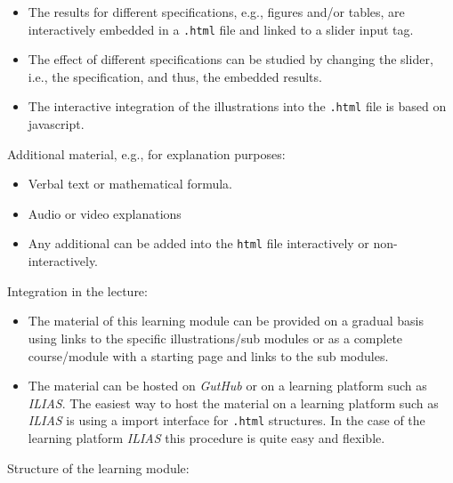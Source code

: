 \documentclass{article}
\begin{document}
\begin{itemize}
	\item The results for different specifications, e.g., figures and/or tables, are interactively embedded in a \texttt{.html} file and linked to a slider input tag.
	\item The effect of different specifications can be studied by changing the slider, i.e., the specification, and thus, the embedded results.
	\item The interactive integration of the illustrations into the \texttt{.html} file is based on javascript.
\end{itemize}

Additional material, e.g., for explanation purposes:

\begin{itemize}
	\item Verbal text or mathematical formula.
	\item Audio or video explanations
	\item Any additional can be added into the \texttt{html} file interactively or non-interactively.
\end{itemize}

Integration in the lecture:

\begin{itemize}
	\item The material of this learning module can be provided on a gradual basis using links to the specific illustrations/sub modules or as a complete course/module with a starting page and links to the sub modules.
	\item The material can be hosted on \emph{GutHub} or on a learning platform such as \emph{ILIAS}. The easiest way to host the material on a learning platform such as \emph{ILIAS} is using a import interface for \texttt{.html} structures. In the case of the learning platform \emph{ILIAS} this procedure is quite easy and flexible.	
\end{itemize}

Structure of the learning module:
\end{document}
